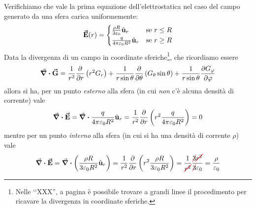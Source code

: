 \begin{examplewt}
	Verifichiamo che vale la prima equazione dell'elettrostatica nel caso del campo generato da una sfera carica uniformemente:
	\begin{equation*}
		\vb*{\va{E}}(r)=\begin{cases}
			\frac{\rho R}{3\varepsilon_0}\hat{\mathbf{u}}_r&\text{se}\ r\leq R\\
			\frac{q}{4\pi\varepsilon_0 R^2}\hat{\mathbf{u}}_r &\text{se}\ r\geq R
		\end{cases}
	\end{equation*}
	Data la divergenza di un campo in coordinate sferiche\footnote{Nelle ‘‘XXX'', a pagina \pageref{DivergenzaSferiche} è possibile trovare a grandi linee il procedimento per ricavare la divergenza in coordinate sferiche.}, che ricordiamo essere
	\begin{equation*}
		\div{\vb*{\va{G}}}=\frac{1}{r^2}\pdv{r}\left(r^2G_r\right)+\frac{1}{r\sin\theta}\pdv{\theta}\left(G_\theta\sin\theta\right)+\frac{1}{r\sin\theta}\pdv{G_\varphi}{\varphi}
	\end{equation*}
	allora si ha, per un punto \textit{esterno} alla sfera (in cui \textit{non} c'è alcuna densità di corrente) vale
	\begin{equation}
		\div{\vb*{\va{E}}}=\div{\frac{q}{4\pi\varepsilon_0 R^2}\hat{\mathbf{u}}_r}=\frac{1}{r^2}\pdv{r}\left(r^2\frac{q}{4\pi\varepsilon_0 R^2}\right)=0
	\end{equation}
	mentre per un punto \textit{interno} alla sfera (in cui si ha una densità di corrente $\rho$) vale
	\begin{equation*}
		\div{\vba{E}}=\div{\left(\frac{\rho R}{3\epsilon_0R^2}\vbh{u}_r\right)}=\frac{1}{r^2}\pdv{r}\left(r^2\frac{\rho R}{3\epsilon_0R^2}\right)=\frac{1}{\Ccancel[red]{r^2}}\frac{\Ccancel[red]{3}\Ccancel[red]{r^2}}{\Ccancel[red]{3}\epsilon_0}=\frac{\rho}{\epsilon_0}
	\end{equation*}
\end{examplewt}
\begin{comment}
	\begin{digression} %
		Non dobbiamo pensare che le equazioni di Maxwell sono una conseguenza di tutti i risultati e gli esperimenti visti fin'ora, ma semmai il \textit{contrario}: sono le equazioni di Maxwell che sono così \textit{fondamentali} da descrivere l'intera teoria elettromagnetica.\\ Volendo, si poteva trattare l'elettromagnetismo enunciando le equazioni di Maxwell e solo successivamente \textit{declinare} i risultati particolari da quelle; la scelta di fare l'esatto opposto è stata fatta per seguire grossomodo l'\textit{approccio storico} alla faccenda. %
	\end{digression}
\end{comment}

